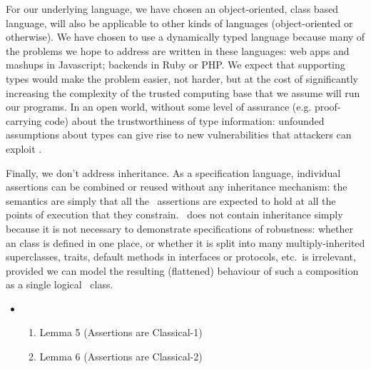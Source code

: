 
For our underlying language, we have chosen an object-oriented, class based language,
 will also be
applicable to other kinds of languages (object-oriented or
otherwise).
%
We have chosen to use a dynamically typed language because many of the
problems we hope to address are written in these
languages: web apps and mashups in Javascript; backends in Ruby or
PHP.  We expect that supporting types would make the problem easier,
not harder, but at the cost of significantly increasing the complexity
of the trusted computing base that we assume will run our programs. In
an open world, without some level of assurance (e.g. proof-carrying
code) about the trustworthiness of type information: unfounded
assumptions about types can give rise to new vulnerabilities that
attackers can exploit \cite{pickles}.

Finally, we don't address inheritance. As a specification language,
individual \Chainmail assertions can be combined or reused without any
inheritance mechanism: the semantics are simply that all
the \Chainmail\ assertions are expected to hold at all the points of
execution that they constrain.  \LangOO\ does not contain inheritance
simply because it is not necessary to demonstrate specifications of
robustness: whether an \LangOO class is defined in one place, or
whether it is split into many multiply-inherited superclasses, traits,
default methods in interfaces or protocols, etc.\ is irrelevant,
provided we can model the resulting (flattened) behaviour of such a
composition as a single logical \LangOO\ class.

\begin{itemize}
\item
\begin{enumerate}
\item
Lemma 5 (Assertions are Classical-1)
\item
Lemma 6 (Assertions are Classical-2)
\end{enumerate}
\end{itemize}


